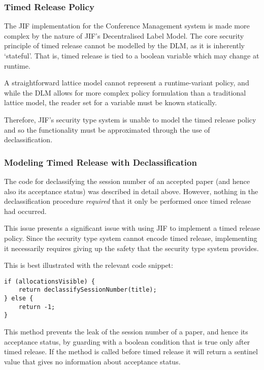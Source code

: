 \subsubsection{Timed Release Policy}

The JIF implementation for the Conference Management system is made more complex by the nature of JIF's Decentralised Label Model. The core security principle of timed release cannot be modelled by the DLM, as it is inherently `stateful'. That is, timed release is tied to a boolean variable which may change at runtime.

A straightforward lattice model cannot represent a runtime-variant policy, and while the DLM allows for more complex policy formulation than a traditional lattice model, the reader set for a variable must be known statically.

Therefore, JIF's security type system is unable to model the timed release policy and so the functionality must be approximated through the use of declassification.

\subsubsection{Modeling Timed Release with Declassification}

The code for declassifying the session number of an accepted paper (and hence also its acceptance status) was described in detail above. However, nothing in the declassification procedure \textit{required} that it only be performed once timed release had occurred.

This issue presents a significant issue with using JIF to implement a timed release policy. Since the security type system cannot encode timed release, implementing it necessarily requires giving up the safety that the security type system provides.

This is best illustrated with the relevant code snippet:

\begin{verbatim}
if (allocationsVisible) {
	return declassifySessionNumber(title);
} else {
	return -1;
}
\end{verbatim}

This method prevents the leak of the session number of a paper, and hence its acceptance status, by guarding with a boolean condition that is true only after timed release. If the method is called before timed release it will return a sentinel value that gives no information about acceptance status.

